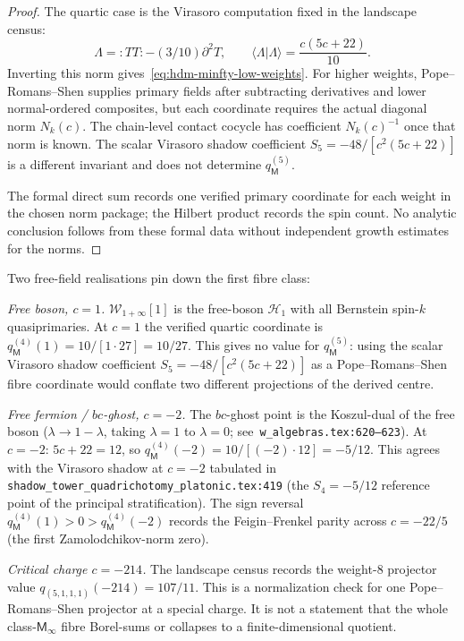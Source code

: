 \begin{proof}
The quartic case is the Virasoro computation fixed in the landscape
census:
\[
  \Lambda={:}TT{:}-(3/10)\partial^2T,\qquad
  \langle\Lambda|\Lambda\rangle=\frac{c(5c+22)}{10}.
\]
Inverting this norm gives~\eqref{eq:hdm-minfty-low-weights}. For
higher weights, Pope--Romans--Shen supplies primary fields after
subtracting derivatives and lower normal-ordered composites, but each
coordinate requires the actual diagonal norm $N_k(c)$. The chain-level
contact cocycle has coefficient $N_k(c)^{-1}$ once that norm is known.
The scalar Virasoro shadow coefficient
$S_5=-48/[c^2(5c+22)]$ is a different invariant and does not determine
$q_\mathsf M^{(5)}$.

The formal direct sum records one verified primary coordinate for each
weight in the chosen norm package; the Hilbert product records the spin
count. No analytic conclusion follows from these formal data without
independent growth estimates for the norms.
\end{proof}

\begin{remark}[Free-boson $c=1$ and free-fermion $c=-2$
realisations; \ClaimStatusConditional]
\label{rem:hdm-minfty-free-field-points}
Two free-field realisations pin down the first fibre class:

\emph{Free boson, $c=1$.} $\mathcal W_{1+\infty}[1]$ is the
free-boson $\mathcal H_1$ with all Bernstein spin-$k$ quasiprimaries.
At $c=1$ the verified quartic coordinate is
$q_\mathsf M^{(4)}(1) = 10/[1\cdot 27] = 10/27$. This gives no value
for $q_\mathsf M^{(5)}$: using the scalar Virasoro shadow coefficient
$S_5=-48/[c^2(5c+22)]$ as a Pope--Romans--Shen fibre coordinate would
conflate two different projections of the derived centre.

\emph{Free fermion / $bc$-ghost, $c=-2$.} The $bc$-ghost point is
the Koszul-dual of the free boson ($\lambda\to 1-\lambda$, taking
$\lambda=1$ to $\lambda=0$; see~\texttt{w\_algebras.tex:620--623}).
At $c=-2$: $5c+22 = 12$, so $q_\mathsf M^{(4)}(-2) = 10/[(-2)\cdot 12]
= -5/12$. This agrees with the Virasoro shadow at $c=-2$ tabulated
in \texttt{shadow\_tower\_quadrichotomy\_platonic.tex:419} (the
$S_4 = -5/12$ reference point of the principal stratification).
The sign reversal $q_\mathsf M^{(4)}(1) > 0 > q_\mathsf M^{(4)}(-2)$
records the Feigin--Frenkel parity across $c = -22/5$ (the first
Zamolodchikov-norm zero).

\emph{Critical charge $c = -214$.} The landscape census records the
weight-$8$ projector value $q_{(5,1,1,1)}(-214)=107/11$. This is
a normalization check for one Pope--Romans--Shen projector at a special
charge. It is not a statement that the whole class-$\mathsf M_\infty$
fibre Borel-sums or collapses to a finite-dimensional quotient.
\end{remark}

